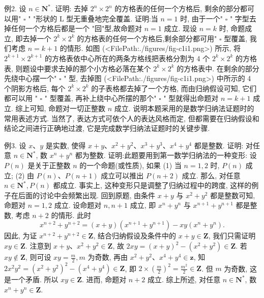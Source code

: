 例2. 设 $n \in \mathbf{N}^*$. 证明: 去掉 $2^n \times 2^n$ 的方格表的任何一个方格后, 剩余的部分都可以用" $\square$ " "形状的 L 型无重叠地完全覆盖.
证明:当 $n=1$ 时, 由于一个" $\square$ " 字型去掉任何一个方格后都是一个 "回"型,故命题对 $n=1$ 成立.
现设 $n=k$ 时, 命题成立, 即去掉一个 $2^k \times 2^k$ 的方格表的任何一个方格后,剩余部分都可用" $\square$ 型覆盖, 我们考虑 $n=k+1$ 的情形.
如图 (<FilePath:./figures/fig-c1i1.png>) 所示, 将 $2^{k+1} \times 2^{k+1}$ 的方格表依中心所在的两条方格线把表格分割为 4 个 $2^k \times 2^k$ 的方格表, 则题设中要求去掉的那个小方格必落在某个 $2^k \times 2^k$ 的方格表中.
在剩余的部分先绕中心摆一个" $\square$ " 型, 去掉图 (<FilePath:./figures/fig-c1i1.png>) 中所示的 4 个阴影方格后, 每个 $2^k \times 2^k$ 的子表格都去掉了一个方格, 而由归纳假设可知, 它们都可以用 " $\square$ " 型覆盖, 再补上绕中心所摆的那个" $\square$ " 型就得出命题对 $n=k+1$ 成立.
综上可知, 命题对一切正整数 $n$ 成立.
说明本题采用的是数学归纳法证题时的常用表述方式.
当然了, 表达方式可依个人的表达风格而定, 但都需要在归纳假设和结论之间进行正确地过渡, 它是完成数学归纳法证题时的关键步骤.



例3. 设 $x 、 y$ 是实数, 使得 $x+y 、 x^2+y^2 、 x^3+y^3 、 x^4+y^4$ 都是整数.
证明: 对任意 $n \in \mathbf{N}^*$, 数 $x^n+y^n$ 都为整数.
证明:此题要用到第一数学归纳法的一种变形: 设 $P(n)$ 是关于正整数 $n$ 的一个命题(或性质), 如果
(1) 当 $n=1,2$ 时, $P(n)$ 成立;
(2) 由 $P(n) 、 P(n+1)$ 成立可以推出 $P(n+2)$ 成立.
那么, 对任意 $n \in \mathbf{N}^*, P(n)$ 都成立.
事实上, 这种变形只是调整了归纳过程中的跨度, 这样的例子在后面的讨论中会频繁出现.
回到原题, 由条件 $x+y$ 与 $x^2+y^2$ 都是整数可知,命题对 $n=1,2$ 成立.
设命题对 $n, n+1$ 成立, 即 $x^n+y^n$ 与 $x^{n+1}+y^{n+1}$ 都是整数, 考虑 $n+2$ 的情形.
此时
$$
x^{n+2}+y^{n+2}=(x+y)\left(x^{n+1}+y^{n+1}\right)-x y\left(x^n+y^n\right) .
$$
因此, 为证 $x^{n+2}+y^{n+2} \in \mathbf{Z}$, 结合归纳假设及条件中的 $x+y \in \mathbf{Z}$, 我们只需证明 $x y \in \mathbf{Z}$.
注意到 $x+y 、 x^2+y^2 \in \mathbf{Z}$, 故 $2 x y=(x+y)^2-\left(x^2+y^2\right) \in \mathbf{Z}$. 若 $x y \notin \mathbf{Z}$, 则可设 $x y=\frac{m}{2}, m$ 为奇数, 再由 $x^2+y^2 、 x^4+y^4 \in \mathbf{z}$, 知 $2 x^2 y^2=\left(x^2+\right. \left.y^2\right)^2-\left(x^4+y^4\right) \in \mathbf{Z}$, 即 $2 \times\left(\frac{m}{2}\right)^2=\frac{m^2}{2} \in \mathbf{Z}$. 但 $m$ 为奇数, 这是一个矛盾.
所以 $x y \in \mathbf{Z}$. 进而, 命题对 $n+2$ 成立.
综上所述, 对任意 $n \in \mathbf{N}^*$, 数 $x^n+y^n \in \mathbf{Z}$.



